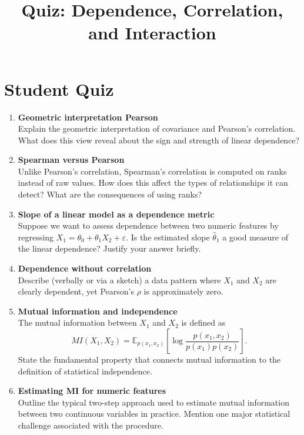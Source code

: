 \documentclass[11pt]{article}
\title{\vspace{-1cm}Quiz: Dependence, Correlation, and Interaction}
\date{}
\author{}
\begin{document}
\maketitle

\section*{Student Quiz}

\begin{enumerate}[label=\textbf{Q\arabic*.}, itemsep=1em]

  \item \textbf{Geometric interpretation Pearson} \\Explain the geometric interpretation of covariance and Pearson’s correlation. What does this view reveal about the sign and strength of linear dependence?

  \item \textbf{Spearman versus Pearson} \\
   Unlike Pearson’s correlation, Spearman’s correlation is computed on ranks instead of raw values.
How does this affect the types of relationships it can detect? What are the consequences of using ranks?

  \item \textbf{Slope of a linear model as a dependence metric} \\
        Suppose we want to assess dependence between two numeric features by regressing $X_1 = \theta_0 + \theta_1 X_2 + \varepsilon$. Is the estimated slope $\hat\theta_1$ a good measure of the linear dependence? Justify your answer briefly.

  \item \textbf{Dependence without correlation} \\
        Describe (verbally or via a sketch) a data pattern where $X_1$ and $X_2$ are clearly dependent, yet Pearson’s $\rho$ is approximately zero.

  \item \textbf{Mutual information and independence} \\
        The mutual information between $X_1$ and $X_2$ is defined as
        \[
          MI(X_1,X_2) =
          \mathbb{E}_{p(x_1,x_2)}
          \left[
            \log \frac{p(x_1,x_2)}{p(x_1)p(x_2)}
          \right].
        \]
        State the fundamental property that connects mutual information to the definition of statistical independence.

  \item \textbf{Estimating MI for numeric features} \\
        Outline the typical two-step approach used to estimate mutual information between two continuous variables in practice. Mention one major statistical challenge associated with the procedure.


\end{enumerate}
\end{document}
